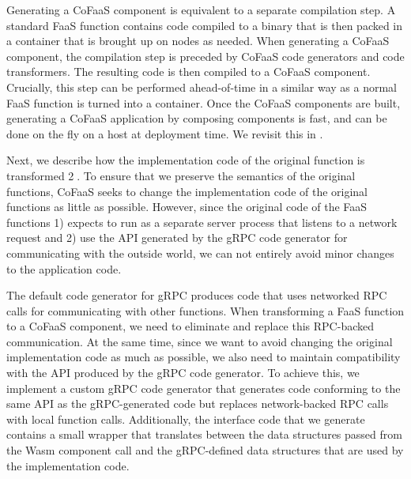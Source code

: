 Generating a CoFaaS component is equivalent to a separate compilation step.  A standard FaaS function contains code compiled to a binary that is then packed in a container that is brought up on nodes as needed. When generating a CoFaaS component, the compilation step is preceded by CoFaaS code generators and code transformers. The resulting code is then compiled to a CoFaaS component. Crucially, this step can be performed ahead-of-time in a similar way as a normal FaaS function is turned into a container. Once the CoFaaS components are built, generating a CoFaaS application by composing components is fast, and can be done on the fly on a host at deployment time. We revisit this in .

Next, we describe how the implementation code of the original function is transformed \textcircled{2}. To ensure that we preserve the semantics of the original functions, CoFaaS seeks to change the implementation code of the original functions as little as possible. However, since the original code of the FaaS functions 1) expects to run as a separate server process that listens to a network request and 2) use the API generated by the gRPC code generator for communicating with the outside world, we can not entirely avoid minor changes to the application code.

The default code generator for gRPC produces code that uses networked RPC calls for communicating with other functions. When transforming a FaaS function to a CoFaaS component, we need to eliminate and replace this RPC-backed communication. At the same time, since we want to avoid changing the original implementation code as much as possible, we also need to maintain compatibility with the API produced by the gRPC code generator. To achieve this, we implement a custom gRPC code generator that generates code conforming to the same API as the gRPC-generated code but replaces network-backed RPC calls with local function calls. Additionally, the interface code that we generate contains a small wrapper that translates between the data structures passed from the Wasm component call and the gRPC-defined data structures that are used by the implementation code.

